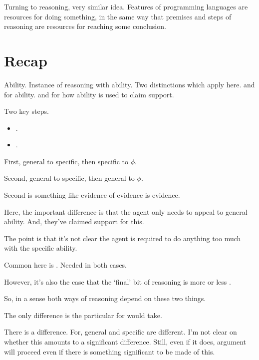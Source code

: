 \begin{note}
  Turning to reasoning, very similar idea.
  Features of programming languages are resources for doing something, in the same way that premises and steps of reasoning are resources for reaching some conclusion.
\end{note}

\section{Recap}
\label{sec:recap-reasoning}

\begin{note}
  Ability.
  Instance of reasoning with ability.
  Two distinctions which apply here.
  \AR{} and \WR{} for ability.
  \adB{} and \adA{} for how ability is used to claim support.
\end{note}

\begin{note}
  Two key steps.
  \begin{itemize}
  \item \gsi{}.
  \item {}.
  \end{itemize}

  First, general to specific, then specific to \(\phi\).

  Second, general to specific, then general to \(\phi\).
\end{note}

\begin{note}
  Second is something like evidence of evidence is evidence.

  Here, the important difference is that the agent only needs to appeal to general ability.
  And, they've claimed support for this.

  The point is that it's not clear the agent is required to do anything too much with the specific ability.
\end{note}

\begin{note}[Focus]
  Common here is \gsi{}.
  Needed in both cases.

  However, it's also the case that the `final' bit of reasoning is more or less .

  So, in a sense both ways of reasoning depend on these two things.

  The only difference is the particular for  would take.

  There is a difference.
  For, general and specific are different.
  I'm not clear on whether this amounts to a significant difference.
  Still, even if it does, argument will proceed even if there is something significant to be made of this.
\end{note}

